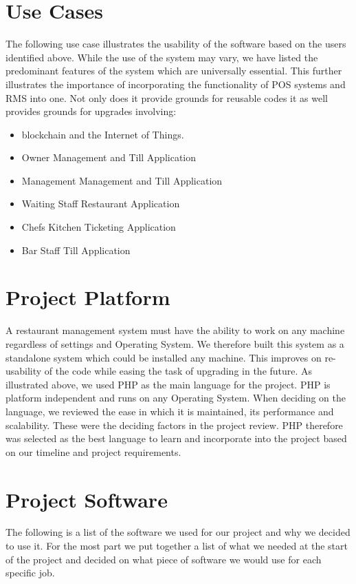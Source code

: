 \section{Use Cases}

The following use case illustrates the usability of the software based on the users identified above. While the use of the system may vary, we have listed the predominant features of the system which are universally essential. This further illustrates the importance of incorporating the functionality of POS systems and RMS into one. Not only does it provide grounds for reusable codes it as well provides grounds for upgrades involving:
\begin{itemize}
    \item blockchain and the Internet of Things.
    \item Owner Management and Till Application
    \item Management Management and Till Application
    \item Waiting Staff Restaurant Application
    \item Chefs Kitchen Ticketing Application
    \item Bar Staff Till Application
\end{itemize}

\section{Project Platform}
A restaurant management system must have the ability to work on any machine regardless of settings and Operating System. We therefore built this system as a standalone system which could be installed any machine. This improves on re-usability of the code while easing the task of upgrading in the future. 
As illustrated above, we used PHP as the main language for the project. PHP is platform independent and runs on any Operating System. When deciding on the language, we reviewed the ease in which it is maintained, its performance and scalability. These were the deciding factors in the project review. PHP therefore was selected as the best language to learn and incorporate into the project based on our timeline and project requirements.

\section{Project Software}

The following is a list of the software we used for our project and why we decided to use it. For the most part we put together a list of what we needed at the start of the project and decided on what piece of software we would use for each specific job. 

